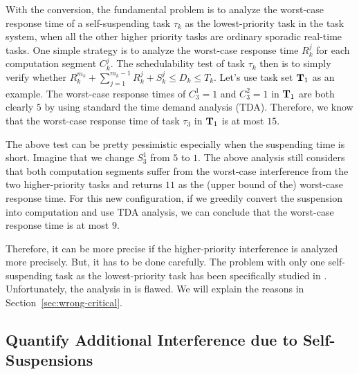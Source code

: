 \begin{table}[t]
\begin{table}[t]
With the conversion, the fundamental problem is to analyze the worst-case response time of a self-suspending task $\tau_k$ as the lowest-priority task in the task system, when all the other higher priority tasks are ordinary sporadic real-time tasks. One simple strategy is to analyze the worst-case response time $R_k^j$ for each computation segment $C_k^j$. The schedulability test of task $\tau_k$ then is to simply verify whether $R_k^{m_k} + \sum_{j=1}^{m_k-1} R_k^j + S_k^j \leq D_k \leq T_k$. Let's use task set ${\bf T}_1$ as an example. The worst-case response times of $C_3^1=1$ and $C_3^2=1$ in ${\bf T}_1$ are both clearly $5$ by using standard the time demand analysis (TDA). Therefore, we know that the worst-case response time of task $\tau_3$ in ${\bf T}_1$ is at most $15$.

The above test can be pretty pessimistic especially when the suspending time is short. Imagine that we change $S_3^1$ from $5$ to $1$. The above analysis still considers that both computation segments suffer from the worst-case interference from the two higher-priority tasks and returns $11$ as the (upper bound of the) worst-case response time. For this new configuration, if we greedily convert the suspension into computation and use TDA analysis, we can conclude that the worst-case response time is at most $9$. 

Therefore, it can be more precise if the higher-priority interference is analyzed more precisely. But, it has to be done carefully.
The problem with only one self-suspending task as the lowest-priority task has been specifically studied in \cite{LR:rtas10,ecrts15nelissen}. Unfortunately, the analysis in \cite{LR:rtas10} is flawed. We will explain the reasons in Section~\ref{sec:wrong-critical}.




\subsection{Quantify Additional Interference due to Self-Suspensions}
\label{sec:method-quantify-interference}


\end{table}
\end{table}
